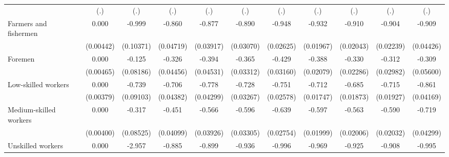 {\begin{tabular}{l*{10}{c}}
                    &         (.)         &         (.)         &         (.)         &         (.)         &         (.)         &         (.)         &         (.)         &         (.)         &         (.)         &         (.)         \\
Farmers and fishermen&       0.000         &      -0.999\sym{***}&      -0.860\sym{***}&      -0.877\sym{***}&      -0.890\sym{***}&      -0.948\sym{***}&      -0.932\sym{***}&      -0.910\sym{***}&      -0.904\sym{***}&      -0.909\sym{***}\\
                    &   (0.00442)         &   (0.10371)         &   (0.04719)         &   (0.03917)         &   (0.03070)         &   (0.02625)         &   (0.01967)         &   (0.02043)         &   (0.02239)         &   (0.04426)         \\
Foremen             &       0.000         &      -0.125         &      -0.326\sym{***}&      -0.394\sym{***}&      -0.365\sym{***}&      -0.429\sym{***}&      -0.388\sym{***}&      -0.330\sym{***}&      -0.312\sym{***}&      -0.309\sym{***}\\
                    &   (0.00465)         &   (0.08186)         &   (0.04456)         &   (0.04531)         &   (0.03312)         &   (0.03160)         &   (0.02079)         &   (0.02286)         &   (0.02982)         &   (0.05600)         \\
Low-skilled workers &       0.000         &      -0.739\sym{***}&      -0.706\sym{***}&      -0.778\sym{***}&      -0.728\sym{***}&      -0.751\sym{***}&      -0.712\sym{***}&      -0.685\sym{***}&      -0.715\sym{***}&      -0.861\sym{***}\\
                    &   (0.00379)         &   (0.09103)         &   (0.04382)         &   (0.04299)         &   (0.03267)         &   (0.02578)         &   (0.01747)         &   (0.01873)         &   (0.01927)         &   (0.04169)         \\
Medium-skilled workers&       0.000         &      -0.317\sym{***}&      -0.451\sym{***}&      -0.566\sym{***}&      -0.596\sym{***}&      -0.639\sym{***}&      -0.597\sym{***}&      -0.563\sym{***}&      -0.590\sym{***}&      -0.719\sym{***}\\
                    &   (0.00400)         &   (0.08525)         &   (0.04099)         &   (0.03926)         &   (0.03305)         &   (0.02754)         &   (0.01999)         &   (0.02006)         &   (0.02032)         &   (0.04299)         \\
Unskilled workers   &       0.000         &      -2.957\sym{***}&      -0.885\sym{***}&      -0.899\sym{***}&      -0.936\sym{***}&      -0.996\sym{***}&      -0.969\sym{***}&      -0.925\sym{***}&      -0.908\sym{***}&      -0.995\sym{***}\\

\end{tabular}}
